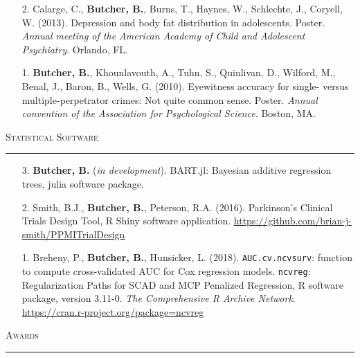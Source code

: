 \documentclass[a4paper]{article}
\begin{document}
\begin{enumerate}
  \item[2.] Calarge, C., \textbf{Butcher, B.}, Burns, T., Haynes, W., Schlechte,
    J., Coryell, W. (2013). Depression and body fat distribution in adolescents.
    Poster. \textit{Annual meeting of the American Academy of Child and Adolescent
    Psychiatry}. Orlando, FL.

  \item[1.] \textbf{Butcher, B.}, Khounlavouth, A., Tuhn, S., Quinlivan, D.,
    Wilford, M., Benal, J., Baron, B., Wells, G. (2010). Eyewitness accuracy for
    single- versus multiple-perpetrator crimes: Not quite common sense. Poster.
    \textit{Annual convention of the Association for Psychological Science}.
    Boston, MA.

\end{enumerate}


\begin{flushleft}
  \Large\textsc{Statistical Software}
  \textcolor{usafagrey}{\rule[0.5\baselineskip]{\textwidth}{0.75pt}}
\end{flushleft}
\vspace{-1.5\baselineskip}

\begin{enumerate}
  \item[3.] \textbf{Butcher, B.} (\textit{in development}). BART.jl: Bayesian
    additive regression trees, julia software package.
  \item[2.] Smith, B.J., \textbf{Butcher, B.}, Peterson, R.A. (2016).
    Parkinson's Clinical Trials Design Tool, R Shiny software application.
    \url{https://github.com/brian-j-smith/PPMITrialDesign}
  \item[1.] Breheny, P., \textbf{Butcher, B.}, Hunsicker, L. (2018).
    \texttt{AUC.cv.ncvsurv}: function to compute cross-validated
    AUC for Cox regression models. \texttt{ncvreg}: Regularization Paths for SCAD
    and MCP Penalized Regression, R software package, version 3.11-0.
    \textit{The Comprehensive R Archive Network}.
    \url{https://cran.r-project.org/package=ncvreg}
\end{enumerate}


\begin{flushleft}
  \Large\textsc{Awards}
  \textcolor{usafagrey}{\rule[0.5\baselineskip]{\textwidth}{0.75pt}}
\end{flushleft}
\vspace{-\baselineskip}
\end{document}
